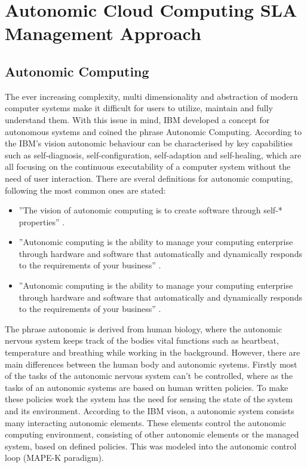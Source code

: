 
\chapter{Autonomic Cloud Computing SLA Management Approach} %
\label{ASLAMaaSApproach} %

\section{Autonomic Computing}
The ever increasing complexity, multi dimensionality and abstraction of modern computer systems make it difficult for users to utilize, maintain and fully understand them. With this issue in mind, IBM \cite{horn2001autonomic} developed a concept for autonomous systems and coined the phrase Autonomic Computing. According to the IBM’s vision autonomic behaviour can be characterised by key capabilities such as self-diagnosis, self-conﬁguration, self-adaption and self-healing, which are all focusing on the continuous executability of a computer system without the need of user interaction. There are sveral definitions for autonomic computing, following the most common ones are stated:

\begin{itemize} 
\item ''The vision of autonomic computing is to create software through self-* properties'' \cite{sterritt2005autonomic}.
\item ''Autonomic computing is the ability to manage your computing enterprise
through hardware and software that automatically and dynamically responds to the
requirements of your business'' \cite{murch2004autonomic}.
\item ''Autonomic computing is the ability to manage your computing enterprise
through hardware and software that automatically and dynamically responds to the
requirements of your business'' \cite{murch2004autonomic}.
\end{itemize} 

The phrase autonomic is derived from human biology, where the autonomic nervous system keeps track of the bodies vital functions such as heartbeat, temperature and breathing  while working in the background. However, there are main differences between the human body and autonomic systems. Firstly most of the tasks of the autonomic nervous system can't be controlled, where as the tasks of an autonomic systems are based on human written policies.
To make these policies work the system has the need for sensing the state of the system and its environment. According to the IBM vison, a autonomic system consists many interacting autonomic elements. These elements control the autonomic computing environment, consisting of other autonomic elements or the managed system, based on defined policies. This was modeled into the autonomic control loop (MAPE-K paradigm).


